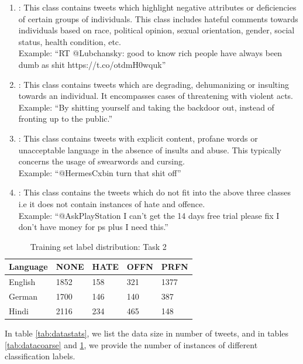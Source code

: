 \documentclass[
]{ceurart}
\begin{document}
\begin{enumerate}
    \item {}: This class contains tweets which highlight negative attributes or deficiencies of certain groups of individuals. This class includes hateful comments towards individuals based on race, political opinion, sexual orientation, gender, social status, health condition, etc.\\
    Example: ``RT @Lubchansky: good to know rich people have always been dumb as shit https://t.co/otdmH0wquk''
    \item {}: This class contains tweets which are degrading, dehumanizing or insulting towards an individual. It encompasses cases of threatening with violent acts. \\
    Example: ``By shitting yourself and taking the backdoor out, instead of fronting up to the public.''
    \item {}: This class contains tweets with explicit content, profane words or unacceptable language in the absence of insults and abuse. This typically concerns the usage of swearwords and cursing. \\
    Example: ``@HermesCxbin turn that shit off''
    \item {}: This class contains the tweets which do not fit into the above three classes i.e it does not contain instances of hate and offence. \\
    Example: ``@AskPlayStation I can’t get the 14 days free trial please fix I don’t have money for ps plus I need this.''
\end{enumerate}

\begin{table}[]
\begin{tabular}{lllll}
\toprule
\textbf{Language} & \textbf{NONE} & \textbf{HATE} & \textbf{OFFN} & \textbf{PRFN} \\
\midrule
English  & 1852 & 158 & 321 & 1377 \\
German   & 1700 & 146 & 140 & 387 \\
Hindi    & 2116 & 234 & 465 & 148 
\end{tabular}
\caption{Training set label distribution: Task 2}
\label{tab:datafine}
\end{table}

In table \ref{tab:datastats}, we list the data size in number of tweets, and in tables \ref{tab:datacoarse} and \ref{tab:datafine}, we provide the number of instances of different classification labels.
\end{document}
